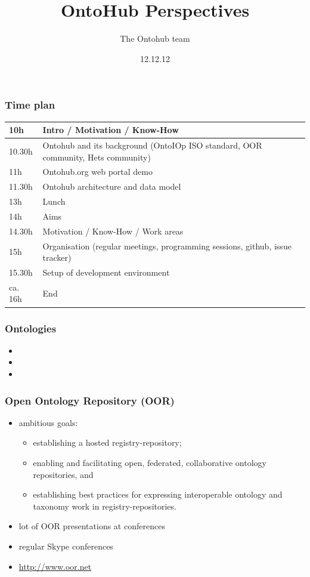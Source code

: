 \documentclass[german]{beamer}
\title{OntoHub Perspectives}
\author{The Ontohub team}
\date{12.12.12}
\begin{document}
\maketitle

\begin{frame}
\frametitle{Time plan}
\begin{tabular}{|l|p{9cm}|}\hline
10h & Intro / Motivation / Know-How\\\hline
10.30h & Ontohub and its background (OntoIOp ISO standard, OOR community, Hets community)\\\hline
11h & Ontohub.org web portal demo\\\hline
11.30h & Ontohub architecture and data model\\\hline
13h & Lunch\\\hline
14h & Aims\\\hline
14.30h & Motivation / Know-How / Work areas\\\hline
15h & Organisation (regular meetings, programming sessions, github, issue tracker)\\\hline
15.30h & Setup of development environment\\\hline
ca. 16h & End\\\hline
\end{tabular}
\end{frame}

\begin{frame}
\frametitle{Ontologies}
\begin{itemize}
\item 
\item 
\item 
\end{itemize}
\end{frame}

\begin{frame}
\frametitle{Open Ontology Repository (OOR)}
\begin{itemize}
\item ambitious goals:
\begin{itemize}
\item establishing a hosted registry-repository;
\item enabling and facilitating open, federated, collaborative ontology repositories, and
\item establishing best practices for expressing interoperable ontology and taxonomy work in registry-repositories.
\end{itemize}
\item lot of OOR presentations at conferences
\item regular Skype conferences
\item \url{http://www.oor.net}
\end{itemize}
\end{frame}
\end{document}

